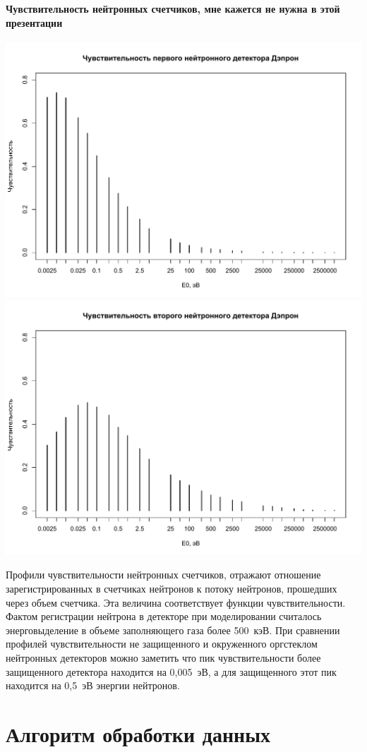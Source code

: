 \documentclass[t, aspectratio=43]{beamer}
\begin{document}
\begin{frame}	
\frametitle{\insertsection} 
\framesubtitle{Чувствительность нейтронных счетчиков, мне кажется не нужна в этой презентации}

	\includegraphics[width=0.5\linewidth]{images/nsens3}
	\includegraphics[width=0.5\linewidth]{images/nsens4}


\tiny{Профили чувствительности нейтронных счетчиков, отражают отношение зарегистрированных в счетчиках нейтронов к потоку нейтронов, прошедших через объем счетчика. Эта величина соответствует функции чувствительности. Фактом регистрации нейтрона в детекторе при моделировании считалось энерговыделение в объеме заполняющего газа более 500~кэВ. При сравнении профилей чувствительности не защищенного и окруженного оргстеклом нейтронных детекторов можно заметить что пик чувствительности более защищенного детектора находится на 0,005~эВ, а для защищенного этот пик находится на 0,5~эВ энергии нейтронов.}

\end{frame}
\section{Алгоритм обработки данных}
\end{document}
